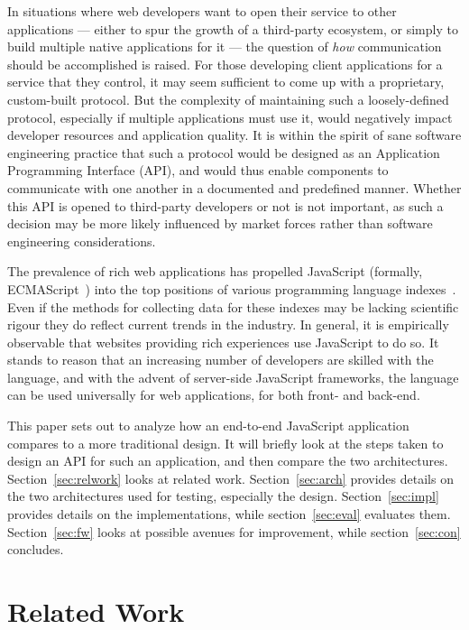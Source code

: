 \documentclass[letterpaper,twocolumn,10pt,draft]{article}
\begin{document}
In situations where web developers want to open their service to other applications --- either to spur the growth of a third-party ecosystem, or simply to build multiple native applications for it --- the question of \emph{how} communication should be accomplished is raised. For those developing client applications for a service that they control, it may seem sufficient to come up with a proprietary, custom-built protocol. But the complexity of maintaining such a loosely-defined protocol, especially if multiple applications must use it, would negatively impact developer resources and application quality. It is within the spirit of sane software engineering practice that such a protocol would be designed as an Application Programming Interface (API), and would thus enable components to communicate with one another in a documented and predefined manner. Whether this API is opened to third-party developers or not is not important, as such a decision may be more likely influenced by market forces rather than software engineering considerations.

The prevalence of rich web applications has propelled JavaScript (formally, ECMAScript~\cite{ecmascriptiso}) into the top positions of various programming language indexes~\cite{ghstats}\cite{tlpi}\cite{tiobe}. Even if the methods for collecting data for these indexes may be lacking scientific rigour they do reflect current trends in the industry. In general, it is empirically observable that websites providing rich experiences use JavaScript to do so. It stands to reason that an increasing number of developers are skilled with the language, and with the advent of server-side JavaScript frameworks, the language can be used universally for web applications, for both front- and back-end.

This paper sets out to analyze how an end-to-end JavaScript application compares to a more traditional design. It will briefly look at the steps taken to design an API for such an application, and then compare the two architectures. Section~\ref{sec:relwork} looks at related work. Section~\ref{sec:arch} provides details on the two architectures used for testing, especially the design. Section~\ref{sec:impl} provides details on the implementations, while section~\ref{sec:eval} evaluates them. Section~\ref{sec:fw} looks at possible avenues for improvement, while section~\ref{sec:con} concludes.

\section{\label{sec:relwork}Related Work}
\end{document}

